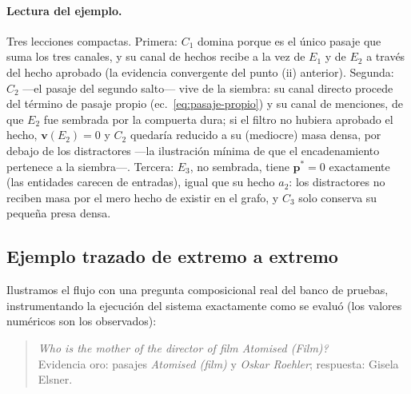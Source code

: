 \documentclass[11pt,a4paper]{article}
\begin{document}
\paragraph{Lectura del ejemplo.}
Tres lecciones compactas. Primera: $C_1$ domina porque es el único pasaje
que suma los tres canales, y su canal de hechos recibe a la vez de $E_1$ y
de $E_2$ a través del hecho aprobado (la evidencia convergente del punto
(ii) anterior). Segunda: $C_2$ ---el pasaje del segundo salto--- vive de
la siembra: su canal directo procede del término de pasaje propio
(ec.~\ref{eq:pasaje-propio}) y su canal de menciones, de que $E_2$ fue
sembrada por la compuerta dura; si el filtro no hubiera aprobado el hecho,
$\mathbf{v}(E_2)=0$ y $C_2$ quedaría reducido a su (mediocre) masa densa,
por debajo de los distractores ---la ilustración mínima de que el
encadenamiento pertenece a la siembra---. Tercera: $E_3$, no sembrada,
tiene $\mathbf{p}^{*}=0$ exactamente (las entidades carecen de entradas),
igual que su hecho $a_2$: los distractores no reciben masa por el mero
hecho de existir en el grafo, y $C_3$ solo conserva su pequeña presa
densa.

\subsection{Ejemplo trazado de extremo a extremo}
\label{sec:traza}

Ilustramos el flujo con una pregunta composicional real del banco de pruebas,
instrumentando la ejecución del sistema exactamente como se evaluó (los
valores numéricos son los observados):

\begin{quote}
\emph{\guillemotleft{}Who is the mother of the director of film Atomised (Film)?\guillemotright{}}\\
Evidencia oro: pasajes \emph{Atomised (film)} y \emph{Oskar Roehler};
respuesta: Gisela Elsner.
\end{quote}
\end{document}
